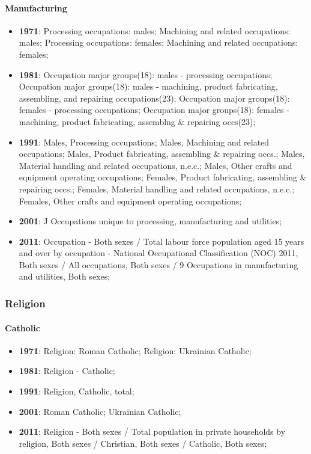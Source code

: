 \documentclass[a4paper]{article}
\begin{document}
\paragraph{Manufacturing}
\begin{itemize}
   \item{\textbf{1971}:  Processing occupations: males; Machining and related occupations: males; Processing occupations: females; Machining and related occupations: females;}
   \item{\textbf{1981}:  Occupation major groups(18): males - processing occupations; Occupation major groups(18): males - machining, product fabricating, assembling, and repairing occupations(23); Occupation major groups(18): females - processing occupations; Occupation major groups(18): females - machining, product fabricating, assemblng \& repairing occs(23);}
   \item{\textbf{1991}:  Males, Processing occupations; Males, Machining and related occupations; Males, Product fabricating, assembling \& repairing occs.; Males, Material handling and related occupations, n.e.c.; Males, Other crafts and equipment operating occupations; Females, Product fabricating, assembling \& repairing occs.; Females, Material handling and related occupations, n.e.c.; Females, Other crafts and equipment operating occupations;}
   \item{\textbf{2001}:  J Occupations unique to processing, manufacturing and utilities;}
   \item{\textbf{2011}:  Occupation - Both sexes / Total labour force population aged 15 years and over by occupation - National Occupational Classification (NOC) 2011, Both sexes / All occupations, Both sexes / 9 Occupations in manufacturing and utilities, Both sexes;}
\end{itemize}

\subsubsection{Religion}
\paragraph{Catholic}
\begin{itemize}
   \item{\textbf{1971}:  Religion: Roman Catholic; Religion: Ukrainian Catholic;}
   \item{\textbf{1981}:  Religion - Catholic;}
   \item{\textbf{1991}:  Religion, Catholic, total;}
   \item{\textbf{2001}:  Roman Catholic; Ukrainian Catholic;}
   \item{\textbf{2011}:  Religion - Both sexes / Total population in private households by religion, Both sexes / Christian, Both sexes / Catholic, Both sexes;}
\end{itemize}
\end{document}
